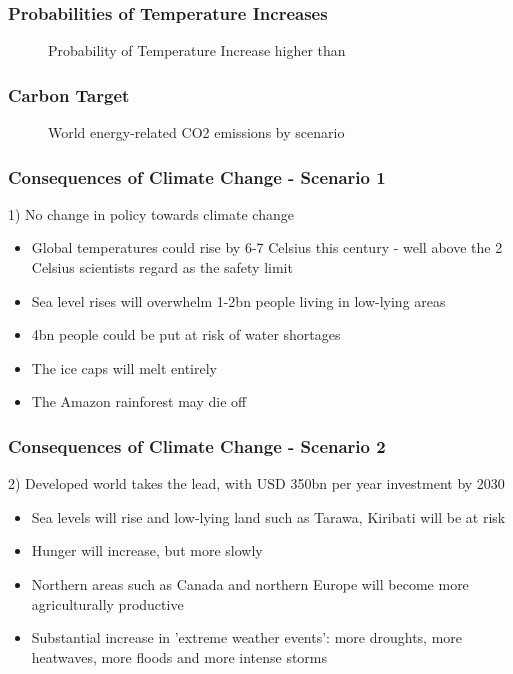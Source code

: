 \begin{frame}
\frametitle{Probabilities of Temperature Increases}
\begin{center}
\begin{figure}[h!]
\centering
{} %
\caption{Probability of Temperature Increase higher than}
\label{fig:temperature}
\end{figure}
\end{center}
\end{frame}

\begin{frame}
\frametitle{Carbon Target}
\begin{center}
\begin{figure}[h!]
\centering
{} %
\caption{World energy-related CO2 emissions by scenario}
\label{fig:emissions}
\end{figure}
\end{center}
\end{frame}


\begin{frame}
 \frametitle{Consequences of Climate Change - Scenario 1}
1) No change in policy towards climate change
\begin{itemize}
\item<1-> Global temperatures could rise by 6-7 Celsius this century - well above the 2 Celsius scientists regard as the safety limit
\item<2-> Sea level rises will overwhelm 1-2bn people living in low-lying areas
\item<3-> 4bn people could be put at risk of water shortages
\item<4-> The ice caps will melt entirely
\item<5-> The Amazon rainforest may die off
\end{itemize}
\end{frame} %

\begin{frame}
 \frametitle{Consequences of Climate Change - Scenario 2}
2) Developed world takes the lead, with USD 350bn per year investment by 2030
\begin{itemize}
\item<1-> Sea levels will rise and low-lying land such as Tarawa, Kiribati will be at risk
\item<2-> Hunger will increase, but more slowly
\item<3-> Northern areas such as Canada and northern Europe will become more agriculturally productive
\item<4-> Substantial increase in 'extreme weather events': more droughts, more heatwaves, more floods and more intense storms
\end{itemize}
\end{frame} %

